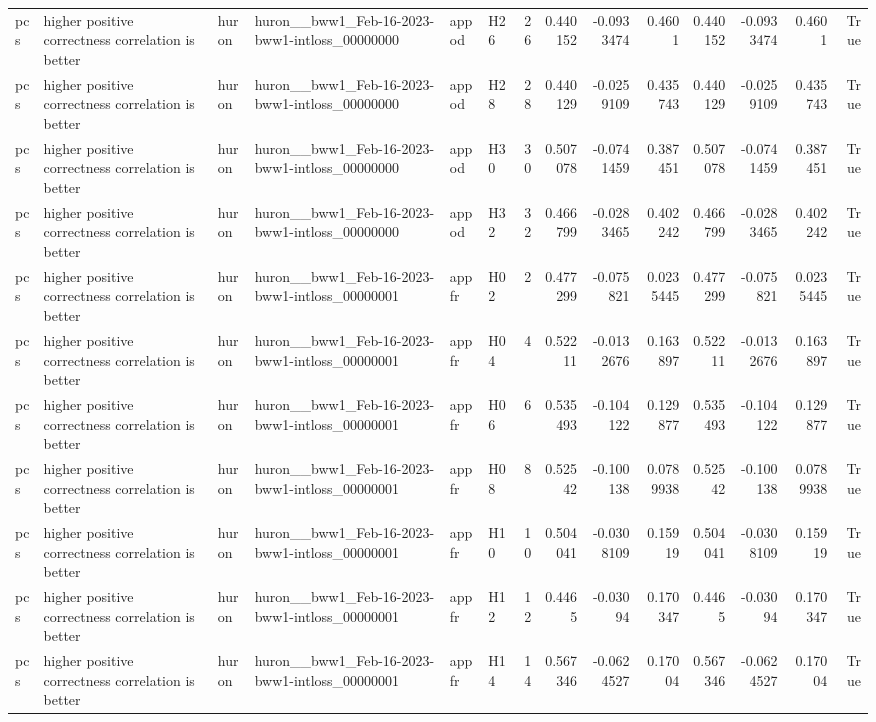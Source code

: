 \begin{longtable}{llllllrrrrrrrr}
pcs & higher positive correctness correlation is better & huron & huron\_\_bww1\_Feb-16-2023-bww1-intloss\_00000000 & appod & H26 & 26 & 0.440152 & -0.0933474 & 0.4601 & 0.440152 & -0.0933474 & 0.4601 & True \\
pcs & higher positive correctness correlation is better & huron & huron\_\_bww1\_Feb-16-2023-bww1-intloss\_00000000 & appod & H28 & 28 & 0.440129 & -0.0259109 & 0.435743 & 0.440129 & -0.0259109 & 0.435743 & True \\
pcs & higher positive correctness correlation is better & huron & huron\_\_bww1\_Feb-16-2023-bww1-intloss\_00000000 & appod & H30 & 30 & 0.507078 & -0.0741459 & 0.387451 & 0.507078 & -0.0741459 & 0.387451 & True \\
pcs & higher positive correctness correlation is better & huron & huron\_\_bww1\_Feb-16-2023-bww1-intloss\_00000000 & appod & H32 & 32 & 0.466799 & -0.0283465 & 0.402242 & 0.466799 & -0.0283465 & 0.402242 & True \\
pcs & higher positive correctness correlation is better & huron & huron\_\_bww1\_Feb-16-2023-bww1-intloss\_00000001 & appfr & H02 & 2 & 0.477299 & -0.075821 & 0.0235445 & 0.477299 & -0.075821 & 0.0235445 & True \\
pcs & higher positive correctness correlation is better & huron & huron\_\_bww1\_Feb-16-2023-bww1-intloss\_00000001 & appfr & H04 & 4 & 0.52211 & -0.0132676 & 0.163897 & 0.52211 & -0.0132676 & 0.163897 & True \\
pcs & higher positive correctness correlation is better & huron & huron\_\_bww1\_Feb-16-2023-bww1-intloss\_00000001 & appfr & H06 & 6 & 0.535493 & -0.104122 & 0.129877 & 0.535493 & -0.104122 & 0.129877 & True \\
pcs & higher positive correctness correlation is better & huron & huron\_\_bww1\_Feb-16-2023-bww1-intloss\_00000001 & appfr & H08 & 8 & 0.52542 & -0.100138 & 0.0789938 & 0.52542 & -0.100138 & 0.0789938 & True \\
pcs & higher positive correctness correlation is better & huron & huron\_\_bww1\_Feb-16-2023-bww1-intloss\_00000001 & appfr & H10 & 10 & 0.504041 & -0.0308109 & 0.15919 & 0.504041 & -0.0308109 & 0.15919 & True \\
pcs & higher positive correctness correlation is better & huron & huron\_\_bww1\_Feb-16-2023-bww1-intloss\_00000001 & appfr & H12 & 12 & 0.4465 & -0.03094 & 0.170347 & 0.4465 & -0.03094 & 0.170347 & True \\
pcs & higher positive correctness correlation is better & huron & huron\_\_bww1\_Feb-16-2023-bww1-intloss\_00000001 & appfr & H14 & 14 & 0.567346 & -0.0624527 & 0.17004 & 0.567346 & -0.0624527 & 0.17004 & True \\

\end{longtable}
